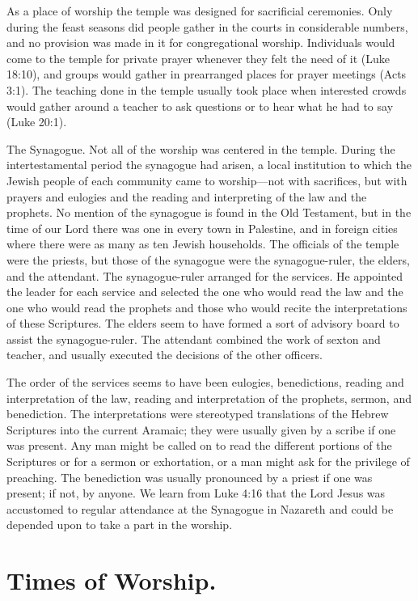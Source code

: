 As a place of worship the temple was designed for sacrificial ceremonies. Only during the feast seasons did people gather in the courts in considerable numbers, and no provision was made in it for congregational worship. Individuals would come to the temple for private prayer whenever they felt the need of it (Luke 18:10), and groups would gather in prearranged places for prayer meetings (Acts 3:1). The teaching done in the temple usually took place when interested crowds would gather around a teacher to ask questions or to hear what he had to say (Luke 20:1).

The Synagogue. Not all of the worship was centered in the temple. During the intertestamental period the synagogue had arisen, a local institution to which the Jewish people of each community came to worship---not with sacrifices, but with prayers and eulogies and the reading and interpreting of the law and the prophets. No mention of the synagogue is found in the Old Testament, but in the time of our Lord there was one in every town in Palestine, and in foreign cities where there were as many as ten Jewish households. The officials of the temple were the priests, but those of the synagogue were the synagogue-ruler, the elders, and the attendant. The synagogue-ruler arranged for the services. He appointed the leader for each service and selected the one who would read the law and the one who would read the prophets and those who would recite the interpretations of these Scriptures. The elders seem to have formed a sort of advisory board to assist the synagogue-ruler. The attendant combined the work of sexton and teacher, and usually executed the decisions of the other officers.

The order of the services seems to have been eulogies, benedictions, reading and interpretation of the law, reading and interpretation of the prophets, sermon, and benediction. The interpretations were stereotyped translations of the Hebrew Scriptures into the current Aramaic; they were usually given by a scribe if one was present. Any man might be called on to read the different portions of the Scriptures or for a sermon or exhortation, or a man might ask for the privilege of preaching. The benediction was usually pronounced by a priest if one was present; if not, by anyone. We learn from Luke 4:16 that the Lord Jesus was accustomed to regular attendance at the Synagogue in Nazareth and could be depended upon to take a part in the worship.

\section{Times of Worship.}

